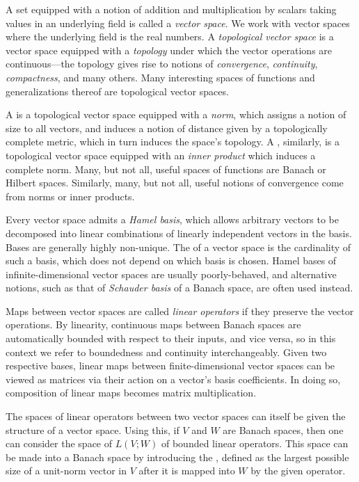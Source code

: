 \documentclass[11pt]{book}
\begin{document}
A set equipped with a notion of addition and multiplication by scalars taking values in an underlying field is called a \emph{vector space}.
We work with vector spaces where the underlying field is the real numbers.
A \emph{topological vector space} is a vector space equipped with a \emph{topology} under which the vector operations are continuous---the topology gives rise to notions of \emph{convergence}, \emph{continuity}, \emph{compactness}, and many others.
Many interesting spaces of functions and generalizations thereof are topological vector spaces.

\label{ntn:banach-hilbert}
A  is a topological vector space equipped with a \emph{norm}, which assigns a notion of size to all vectors, and induces a notion of distance given by a topologically complete metric, which in turn induces the space's topology.
A , similarly, is a topological vector space equipped with an \emph{inner product} which induces a complete norm.
Many, but not all, useful spaces of functions are Banach or Hilbert spaces.
Similarly, many, but not all, useful notions of convergence come from norms or inner products.

Every vector space admits a \emph{Hamel basis}, which allows arbitrary vectors to be decomposed into linear combinations of linearly independent vectors in the basis.
Bases are generally highly non-unique.
The  of a vector space is the cardinality of such a basis, which does not depend on which basis is chosen.
Hamel bases of infinite-dimensional vector spaces are usually poorly-behaved, and alternative notions, such as that of \emph{Schauder basis} of a Banach space, are often used instead.

Maps between vector spaces are called \emph{linear operators} if they preserve the vector operations.
By linearity, continuous maps between Banach spaces are automatically bounded with respect to their inputs, and vice versa, so in this context we refer to boundedness and continuity interchangeably.
Given two respective bases, linear maps between finite-dimensional vector spaces can be viewed as matrices via their action on a vector's basis coefficients.
In doing so, composition of linear maps becomes matrix multiplication.

\label{ntn:bounded-operators}
The spaces of linear operators between two vector spaces can itself be given the structure of a vector space.
Using this, if $V$ and $W$ are Banach spaces, then one can consider the space of $L(V;W)$ of bounded linear operators.
This space can be made into a Banach space by introducing the , defined as the largest possible size of a unit-norm vector in $V$ after it is mapped into $W$ by the given operator. 
\end{document}
